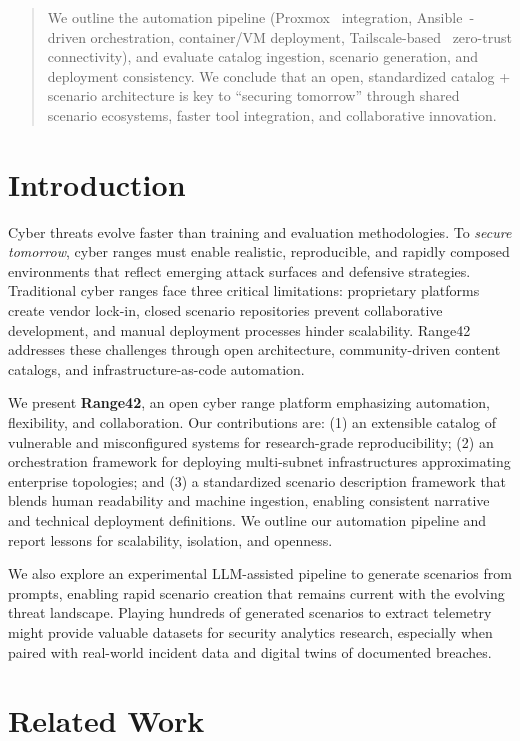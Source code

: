 \documentclass[11pt]{article}
\begin{document}
\begin{abstract}
We outline the automation pipeline (Proxmox~\cite{proxmox} integration, Ansible~\cite{ansible}-driven orchestration, container/VM deployment, Tailscale-based~\cite{tailscale} zero-trust connectivity), and evaluate catalog ingestion, scenario generation, and deployment consistency. We conclude that an open, standardized catalog + scenario architecture is key to “securing tomorrow” through shared scenario ecosystems, faster tool integration, and collaborative innovation.
\end{abstract}

\section{Introduction}
Cyber threats evolve faster than training and evaluation methodologies. To \emph{secure tomorrow}, cyber ranges must enable realistic, reproducible, and rapidly composed environments that reflect emerging attack surfaces and defensive strategies. Traditional cyber ranges face three critical limitations: proprietary platforms create vendor lock-in, closed scenario repositories prevent collaborative development, and manual deployment processes hinder scalability. Range42 addresses these challenges through open architecture, community-driven content catalogs, and infrastructure-as-code automation.

We present \textbf{Range42}, an open cyber range platform emphasizing automation, flexibility, and collaboration. Our contributions are: (1) an extensible catalog of vulnerable and misconfigured systems for research-grade reproducibility; (2) an orchestration framework for deploying multi-subnet infrastructures approximating enterprise topologies; and (3) a standardized scenario description framework that blends human readability and machine ingestion, enabling consistent narrative and technical deployment definitions. We outline our automation pipeline and report lessons for scalability, isolation, and openness.

We also explore an experimental LLM-assisted pipeline to generate scenarios from prompts, enabling rapid scenario creation that remains current with the evolving threat landscape. Playing hundreds of generated scenarios to extract telemetry might provide valuable datasets for security analytics research, especially when paired with real-world incident data and digital twins of documented breaches.

\section{Related Work}
\end{document}

